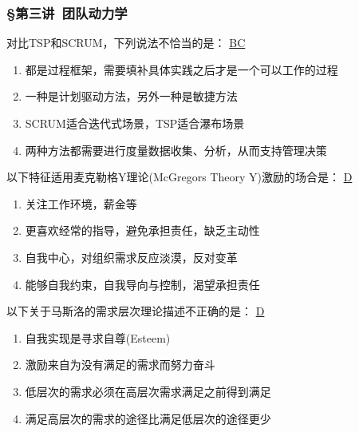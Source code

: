 \subsubsection*{\S 第三讲\ 团队动力学}
\setcounter{problemname}{0}

\begin{problem}
	对比TSP和SCRUM，下列说法不恰当的是： 
	\uline{BC}    
        \begin{enumerate}[label=\Alph*.]
            \item 都是过程框架，需要填补具体实践之后才是一个可以工作的过程
            \item 一种是计划驱动方法，另外一种是敏捷方法
            \item SCRUM适合迭代式场景，TSP适合瀑布场景
            \item 两种方法都需要进行度量数据收集、分析，从而支持管理决策
        \end{enumerate}
\end{problem}




\begin{problem}
	以下特征适用麦克勒格Y理论(McGregors Theory Y)激励的场合是：
	\uline{D}    
        \begin{enumerate}[label=\Alph*.]
            \item 关注工作环境，薪金等
            \item 更喜欢经常的指导，避免承担责任，缺乏主动性
            \item 自我中心，对组织需求反应淡漠，反对变革
            \item 能够自我约束，自我导向与控制，渴望承担责任
        \end{enumerate}
\end{problem}



\begin{problem}
	以下关于马斯洛的需求层次理论描述不正确的是：
	\uline{D}    
        \begin{enumerate}[label=\Alph*.]
            \item 自我实现是寻求自尊(Esteem)
            \item 激励来自为没有满足的需求而努力奋斗
            \item 低层次的需求必须在高层次需求满足之前得到满足
            \item 满足高层次的需求的途径比满足低层次的途径更少
        \end{enumerate}
\end{problem}



